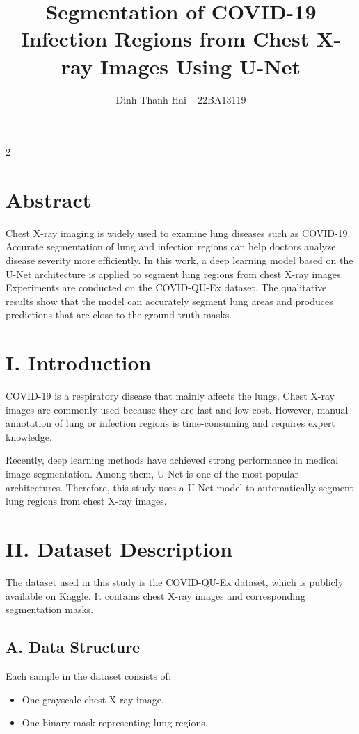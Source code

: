 \documentclass[10pt,a4paper]{article}
\title{\textbf{Segmentation of COVID-19 Infection Regions from Chest X-ray Images Using U-Net}}
\author{Dinh Thanh Hai -- 22BA13119}
\date{}
\begin{document}
\maketitle

\begin{multicols}{2}

\section*{Abstract}
Chest X-ray imaging is widely used to examine lung diseases such as COVID-19.
Accurate segmentation of lung and infection regions can help doctors analyze
disease severity more efficiently.
In this work, a deep learning model based on the U-Net architecture is applied
to segment lung regions from chest X-ray images.
Experiments are conducted on the COVID-QU-Ex dataset.
The qualitative results show that the model can accurately segment lung areas
and produces predictions that are close to the ground truth masks.

\section*{I. Introduction}
COVID-19 is a respiratory disease that mainly affects the lungs.
Chest X-ray images are commonly used because they are fast and low-cost.
However, manual annotation of lung or infection regions is time-consuming and
requires expert knowledge.

Recently, deep learning methods have achieved strong performance in medical image
segmentation.
Among them, U-Net is one of the most popular architectures.
Therefore, this study uses a U-Net model to automatically segment lung regions
from chest X-ray images.

\section*{II. Dataset Description}
The dataset used in this study is the COVID-QU-Ex dataset, which is publicly
available on Kaggle.
It contains chest X-ray images and corresponding segmentation masks.

\subsection*{A. Data Structure}
Each sample in the dataset consists of:
\begin{itemize}
    \item One grayscale chest X-ray image.
    \item One binary mask representing lung regions.
\end{itemize}


\end{multicols}
\end{document}
